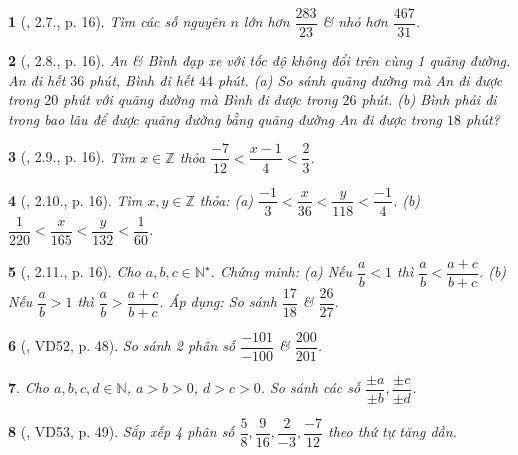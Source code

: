 \documentclass{article}
\newtheorem{baitoan}{}
\begin{document}
\begin{baitoan}[\cite{Binh_boi_duong_Toan_6_tap_2}, 2.7., p. 16]
	Tìm các số nguyên $n$ lớn hơn $\dfrac{283}{23}$ \& nhỏ hơn $\dfrac{467}{31}$.
\end{baitoan}

\begin{baitoan}[\cite{Binh_boi_duong_Toan_6_tap_2}, 2.8., p. 16]
	An \& Bình đạp xe với tốc độ không đổi trên cùng 1 quãng đường. An đi hết $36$ phút, Bình đi hết $44$ phút. (a) So sánh quãng đường mà An đi được trong $20$ phút với quãng đường mà Bình đi được trong $26$ phút. (b) Bình phải đi trong bao lâu để được quãng đường bằng quãng đường An đi được trong $18$ phút?
\end{baitoan}

\begin{baitoan}[\cite{Binh_boi_duong_Toan_6_tap_2}, 2.9., p. 16]
	Tìm $x\in\mathbb{Z}$ thỏa $\dfrac{-7}{12} < \dfrac{x - 1}{4} < \dfrac{2}{3}$.
\end{baitoan}

\begin{baitoan}[\cite{Binh_boi_duong_Toan_6_tap_2}, 2.10., p. 16]
	Tìm $x,y\in\mathbb{Z}$ thỏa: (a) $\dfrac{-1}{3} < \dfrac{x}{36} < \dfrac{y}{118} < \dfrac{-1}{4}$. (b) $\dfrac{1}{220} < \dfrac{x}{165} < \dfrac{y}{132} < \dfrac{1}{60}$.
\end{baitoan}

\begin{baitoan}[\cite{Binh_boi_duong_Toan_6_tap_2}, 2.11., p. 16]
	Cho $a,b,c\in\mathbb{N}^\star$. Chứng minh: (a) Nếu $\dfrac{a}{b} < 1$ thì $\dfrac{a}{b} < \dfrac{a + c}{b + c}$. (b) Nếu $\dfrac{a}{b} > 1$ thì $\dfrac{a}{b} > \dfrac{a + c}{b + c}$. Áp dụng: So sánh $\dfrac{17}{18}$ \& $\dfrac{26}{27}$.
\end{baitoan}

\begin{baitoan}[\cite{Tuyen_Toan_6}, VD52, p. 48]
	So sánh 2 phân số $\dfrac{-101}{-100}$ \& $\dfrac{200}{201}$.
\end{baitoan}

\begin{baitoan}
	Cho $a,b,c,d\in\mathbb{N}$, $a > b > 0$, $d > c > 0$. So sánh các số $\dfrac{\pm a}{\pm b},\dfrac{\pm c}{\pm d}$.
\end{baitoan}

\begin{baitoan}[\cite{Tuyen_Toan_6}, VD53, p. 49]
	Sắp xếp 4 phân số $\dfrac{5}{8},\dfrac{9}{16},\dfrac{2}{-3},\dfrac{-7}{12}$ theo thứ tự tăng dần.
\end{baitoan}
\end{document}
